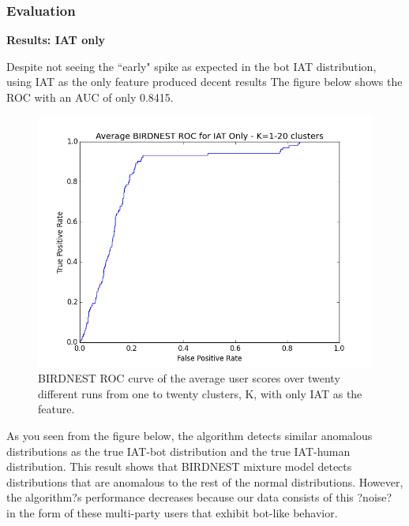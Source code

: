 \documentclass{article} %
\begin{document}
\subsubsection{Evaluation}

\textbf{Results: IAT only}

Despite not seeing the ``early" spike as expected in the bot IAT distribution, using IAT as the only feature produced decent results
The figure below shows the ROC with an AUC of only 0.8415.

\begin{figure}[h]
\centering
{\caption{BIRDNEST ROC curve of the average user scores over twenty different runs from one to twenty clusters, K, with only IAT as the feature.} \includegraphics[scale=0.47]{img/bird_iat_roc.png}}
\end{figure}

As you seen from the figure below, the algorithm detects similar anomalous distributions as the true IAT-bot distribution and the true IAT-human distribution. This result shows that BIRDNEST mixture model detects distributions that are anomalous to the rest of the normal distributions. However, the algorithm?s performance decreases because our data consists of this ?noise? in the form of these multi-party users that exhibit bot-like behavior.

\end{document}
